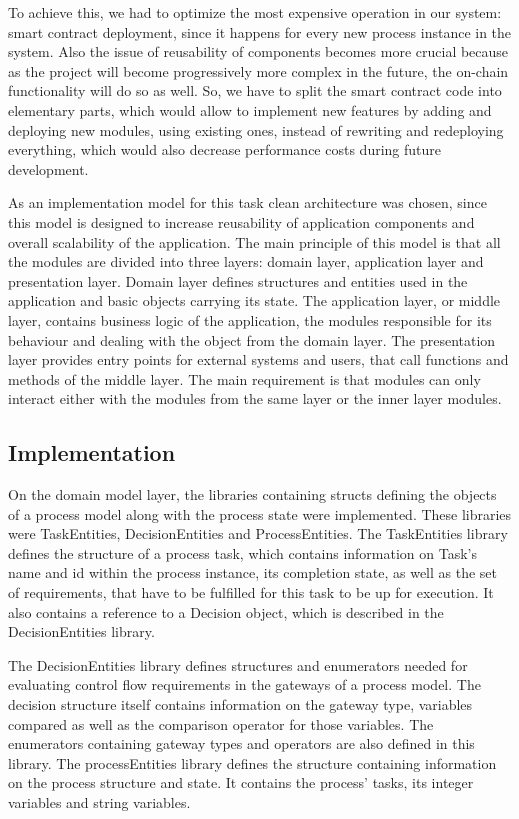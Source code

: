 To achieve this, we had to optimize the most expensive operation in our system: smart contract deployment, since it happens for every new process instance in the system. Also the issue of reusability of components becomes more crucial because as the project will become progressively more complex in the future, the on-chain functionality will do so as well. So, we have to split the smart contract code into elementary parts, which would allow to implement new features by adding and deploying new modules, using existing ones, instead of rewriting and redeploying everything, which would also decrease performance costs during future development.

As an implementation model for this task clean architecture was chosen, since this model is designed to increase reusability of application components and overall scalability of the application. The main principle of this model is that all the modules are divided into three layers: domain layer, application layer and presentation layer. Domain layer defines structures and entities used in the application and basic objects carrying its state. The application layer, or middle layer, contains business logic of the application, the modules responsible for its behaviour and dealing with the object from the domain layer. The presentation layer provides entry points for external systems and users, that call functions and methods of the middle layer. The main requirement is that modules can only interact either with the modules from the same layer or the inner layer modules.

\subsection{Implementation}
\label{sec:impr:eth:implementation}

On the domain model layer, the libraries containing structs defining the objects of a process model along with the process state were implemented. These libraries were TaskEntities, DecisionEntities and ProcessEntities.\newline
The TaskEntities library defines the structure of a process task, which contains information on Task's name and id within the process instance, its completion state, as well as the set of requirements, that have to be fulfilled for this task to be up for execution. It also contains a reference to a Decision object, which is described in the DecisionEntities library.

The DecisionEntities library defines structures and enumerators needed for evaluating control flow requirements in the gateways of a process model. The decision structure itself contains information on the gateway type, variables compared as well as the comparison operator for those variables. The enumerators containing gateway types and operators are also defined in this library.\newline
The processEntities library defines the structure containing information on the process structure and state. It contains the process' tasks, its integer variables and string variables.

